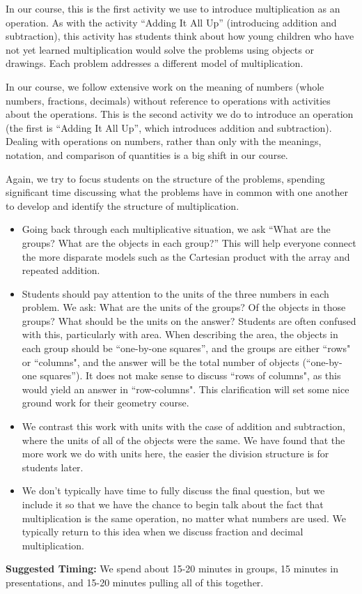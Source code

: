 \documentclass[nooutcomes]{ximera}
\begin{document}
\newpage
\begin{instructorNotes}
In our course, this is the first activity we use to introduce multiplication as an operation.  As with the activity ``Adding It All Up'' (introducing addition and subtraction), this activity has students think about how young children who have not yet learned multiplication would solve the problems using objects or drawings.  Each problem addresses a different model of multiplication.

In our course, we follow extensive work on the meaning of numbers (whole numbers, fractions, decimals) without reference to operations with activities about the operations.  This is the second activity we do to introduce an operation (the first is ``Adding It All Up'', which introduces addition and subtraction). Dealing with operations on numbers, rather than only with the meanings, notation, and comparison of quantities is a big shift in our course.

Again, we try to focus students on the structure of the problems, spending significant time discussing what the problems have in common with one another to develop and identify the structure of multiplication.

\begin{itemize}
	\item Going back through each multiplicative situation, we ask ``What are the groups? What are the objects in each group?''  This will help everyone connect the more disparate models such as the Cartesian product with the array and repeated addition.  
	\item Students should pay attention to the units of the three numbers in each problem. We ask: What are the units of the groups?  Of the objects in those groups?  What should be the units on the answer?  Students are often confused with this, particularly with area.  When describing the area, the objects in each group should be ``one-by-one squares'', and the groups are either ``rows" or ``columns", and the answer will be the total number of objects (``one-by-one squares''). It does not make sense to discuss ``rows of columns", as this would yield an answer in ``row-columns". This clarification will set some nice ground work for their geometry course.
	\item We contrast this work with units with the case of addition and subtraction, where the units of all of the objects were the same.  We have found that the more work we do with units here, the easier the division structure is for students later.
	\item We don't typically have time to fully discuss the final question, but we include it so that we have the chance to begin talk about the fact that multiplication is the same operation, no matter what numbers are used.  We typically return to this idea when we discuss fraction and decimal multiplication.
\end{itemize}




{\bf Suggested Timing:} We spend about 15-20 minutes in groups, 15 minutes in presentations, and 15-20 minutes pulling all of this together.
\end{instructorNotes}
\end{document}
